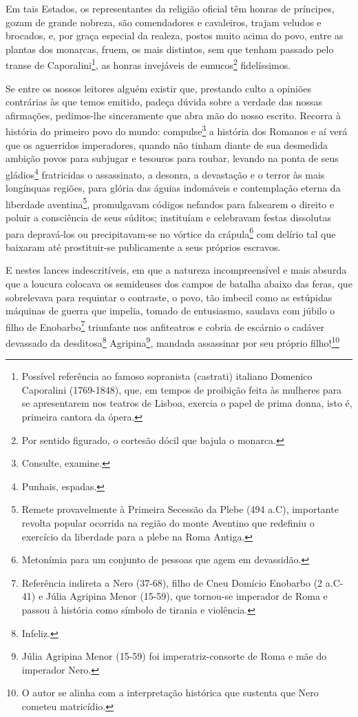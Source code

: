 Em tais Estados, os representantes da religião oficial têm honras de
príncipes, gozam de grande nobreza, são comendadores e cavaleiros,
trajam veludos e brocados, e, por graça especial da realeza, postos
muito acima do povo, entre as plantas dos monarcas, fruem, os mais
distintos, sem que tenham passado pelo transe de Caporalini\footnote{
  Possível referência ao famoso sopranista (castrati) italiano Domenico
  Caporalini (1769-1848), que, em tempos de proibição feita às mulheres
  para se apresentarem nos teatros de Lisboa, exercia o papel de prima
  donna, isto é, primeira cantora da ópera.}, as honras invejáveis de
eunucos\footnote{Por sentido figurado, o cortesão dócil que bajula o
  monarca.} fidelíssimos.

Se entre os nossos leitores alguém existir que, prestando culto a
opiniões contrárias às que temos emitido, padeça dúvida sobre a verdade
das nossas afirmações, pedimos-lhe sinceramente que abra mão do nosso
escrito. Recorra à história do primeiro povo do mundo:
compulse\footnote{Consulte, examine.} a história dos Romanos e aí verá
que os aguerridos imperadores, quando não tinham diante de sua desmedida
ambição povos para subjugar e tesouros para roubar, levando na ponta de
seus gládios\footnote{Punhais, espadas.} fratricidas o assassinato, a
desonra, a devastação e o terror às mais longínquas regiões, para glória
das águias indomáveis e contemplação eterna da liberdade
aventina\footnote{Remete provavelmente à Primeira Secessão da Plebe
  (494 a.C), importante revolta popular ocorrida na região do monte
  Aventino que redefiniu o exercício da liberdade para a plebe na Roma
  Antiga.}, promulgavam códigos nefandos para falsearem o direito e
poluir a consciência de seus súditos; instituíam e celebravam festas
dissolutas para depravá-los ou precipitavam-se no vórtice da
crápula\footnote{Metonímia para um conjunto de pessoas que agem em
  devassidão.} com delírio tal que baixaram até prostituir-se
publicamente a seus próprios escravos.

E nestes lances indescritíveis, em que a natureza incompreensível e mais
absurda que a loucura colocava os semideuses dos campos de batalha
abaixo das feras, que sobrelevava para requintar o contraste, o povo,
tão imbecil como as estúpidas máquinas de guerra que impelia, tomado de
entusiasmo, saudava com júbilo o filho de Enobarbo\footnote{Referência
  indireta a Nero (37-68), filho de Cneu Domício Enobarbo (2 a.C-41) e
  Júlia Agripina Menor (15-59), que tornou-se imperador de Roma e passou
  à história como símbolo de tirania e violência.} triunfante nos
anfiteatros e cobria de escárnio o cadáver devassado da
desditosa\footnote{Infeliz.} Agripina\footnote{Júlia Agripina Menor
  (15-59) foi imperatriz-consorte de Roma e mãe do imperador Nero.},
mandada assassinar por seu próprio filho!\footnote{O autor se alinha
  com a interpretação histórica que sustenta que Nero cometeu
  matricídio.}

